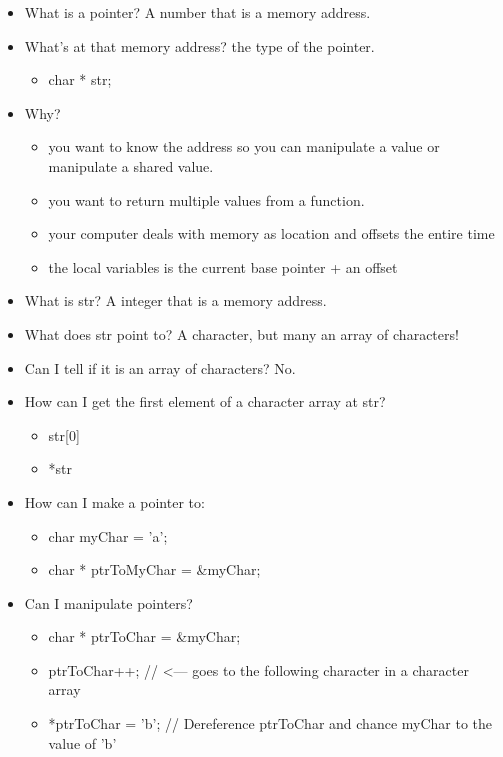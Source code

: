 \documentclass[11pt]{article}
\begin{document}
\begin{itemize}
\item What is a pointer? A number that is a memory address.

\item What's at that memory address? the type of the pointer.

\begin{itemize}
\item char * str;
\end{itemize}

\item Why?

\begin{itemize}
\item you want to know the address so you can manipulate a value or
manipulate a shared value.
\item you want to return multiple values from a function.
\item your computer deals with memory as location and offsets the entire time
\item the local variables is the current base pointer + an offset
\end{itemize}

\item What is str? A integer that is a memory address.
\item What does str point to? A character, but many an array of characters!
\item Can I tell if it is an array of characters? No.
\item How can I get the first element of a character array at str?

\begin{itemize}
\item str[0]
\item *str
\end{itemize}

\item How can I make a pointer to:
\begin{itemize}
\item char myChar = 'a';
\item char * ptrToMyChar = \&myChar;
\end{itemize}

\item Can I manipulate pointers?
\begin{itemize}
\item char * ptrToChar = \&myChar;
\item ptrToChar++; // <--- goes to the following character in a character array
\item *ptrToChar = 'b'; // Dereference ptrToChar and chance myChar to the value of 'b'
\end{itemize}
\end{itemize}
\end{document}
